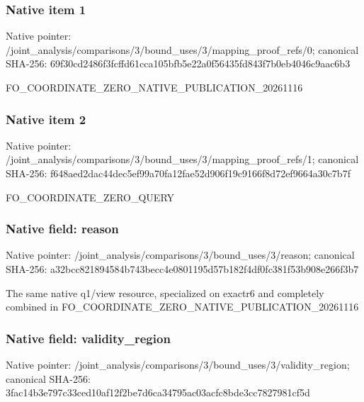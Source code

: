 \documentclass[10pt,a4paper]{article}
\begin{document}
\subsubsection{Native item 1}
Native pointer: /joint\_\allowbreak{}analysis/comparisons/3/bound\_\allowbreak{}uses/3/mapping\_\allowbreak{}proof\_\allowbreak{}refs/0; canonical SHA-256: 69f30cd2486f3fcffd61cca105bfb5e22a0f56435fd843f7b0eb4046c9aac6b3

\begingroup\raggedright\sloppy FO\_\allowbreak{}COORDINATE\_\allowbreak{}ZERO\_\allowbreak{}NATIVE\_\allowbreak{}PUBLICATION\_\allowbreak{}20261116\par\endgroup

\subsubsection{Native item 2}
Native pointer: /joint\_\allowbreak{}analysis/comparisons/3/bound\_\allowbreak{}uses/3/mapping\_\allowbreak{}proof\_\allowbreak{}refs/1; canonical SHA-256: f648aed2dac44dec5ef99a70fa12fae52d906f19c9166f8d72ef9664a30c7b7f

\begingroup\raggedright\sloppy FO\_\allowbreak{}COORDINATE\_\allowbreak{}ZERO\_\allowbreak{}QUERY\par\endgroup

\subsubsection{Native field: reason}
Native pointer: /joint\_\allowbreak{}analysis/comparisons/3/bound\_\allowbreak{}uses/3/reason; canonical SHA-256: a32bcc821894584b743becc4e0801195d57b182f4df0fc381f53b908e266f3b7

\begingroup\raggedright\sloppy The same native q1/\allowbreak{}view resource,\allowbreak{} specialized on exactr6 and completely combined in FO\_\allowbreak{}COORDINATE\_\allowbreak{}ZERO\_\allowbreak{}NATIVE\_\allowbreak{}PUBLICATION\_\allowbreak{}20261116\par\endgroup

\subsubsection{Native field: validity\_\allowbreak{}region}
Native pointer: /joint\_\allowbreak{}analysis/comparisons/3/bound\_\allowbreak{}uses/3/validity\_\allowbreak{}region; canonical SHA-256: 3fac14b3e797c33ced10af12f2be7d6ca34795ac03acfc8bde3cc7827981cf5d
\end{document}
